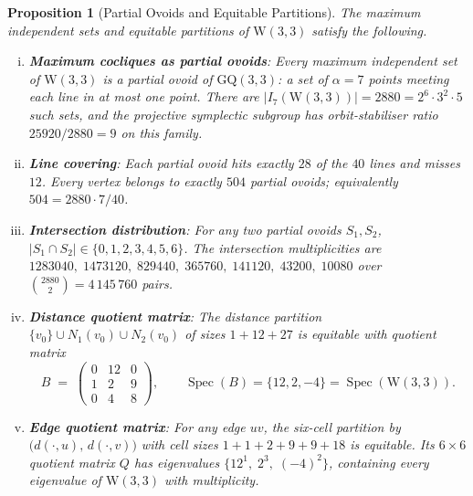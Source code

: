 \documentclass[12pt,a4paper]{article}
\newtheorem{proposition}[theorem]{Proposition}
\newcommand{\W}{\mathrm{W}(3,3)}
\begin{document}
\begin{proposition}[Partial Ovoids and Equitable Partitions]\label{prop:partialovoids}
The maximum independent sets and equitable partitions of $\W$ satisfy
the following.
\begin{enumerate}[(i)]
  \item \textbf{Maximum cocliques as partial ovoids}:
        Every maximum independent set of $\W$ is a partial ovoid of
        $\mathrm{GQ}(3,3)$: a set of $\alpha = 7$ points meeting
        each line in at most one point.
        There are $|I_7(\W)| = 2880 = 2^6 \cdot 3^2 \cdot 5$ such sets,
      and the projective symplectic subgroup has orbit-stabiliser ratio
      $25920/2880 = 9$ on this family.
  \item \textbf{Line covering}:
        Each partial ovoid hits exactly $28$ of the $40$ lines
        and misses $12$.  Every vertex belongs to exactly $504$
        partial ovoids; equivalently $504 = 2880 \cdot 7/40$.
  \item \textbf{Intersection distribution}:
        For any two partial ovoids $S_1, S_2$,
        $|S_1 \cap S_2| \in \{0,1,2,3,4,5,6\}$.
        The intersection multiplicities are
        $1283040,\; 1473120,\; 829440,\; 365760,\;
         141120,\; 43200,\; 10080$
        over $\binom{2880}{2} = 4\,145\,760$ pairs.
  \item \textbf{Distance quotient matrix}:
        The distance partition $\{v_0\} \cup N_1(v_0) \cup N_2(v_0)$
        of sizes $1 + 12 + 27$ is equitable with quotient matrix
        \[
          B \;=\;
          \begin{pmatrix}
            0 & 12 & 0 \\
            1 & 2  & 9 \\
            0 & 4  & 8
          \end{pmatrix},
          \qquad
          \operatorname{Spec}(B) = \{12, 2, -4\} = \operatorname{Spec}(\W).
        \]
  \item \textbf{Edge quotient matrix}:
        For any edge $uv$, the six-cell partition by
        $\bigl(d(\cdot,u),\, d(\cdot,v)\bigr)$ with cell sizes
        $1{+}1{+}2{+}9{+}9{+}18$ is equitable.
        Its $6 \times 6$ quotient matrix $Q$ has eigenvalues
        $\{12^1,\; 2^3,\; (-4)^2\}$, containing every eigenvalue
        of $\W$ with multiplicity.
\end{enumerate}
\end{proposition}
\end{document}
